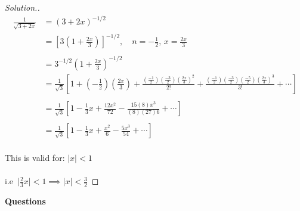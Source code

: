 \documentclass[11pt,a4paper]{article}
\theoremstyle{definition}
\newenvironment{solution}
  {\renewcommand{\qedsymbol}{}\begin{proof}[\textit{Solution}.]}
  {\end{proof}}
\begin{document}
\begin{solution}

\begin{align*}
\frac{1}{\sqrt{3+2x}} & = (3+2x)^{-1/2}\\
                      & = \left[3\left(1+\frac{2x}{3}\right)\right]^{-1/2},\quad  n=-\frac{1}{2},\, x=\frac{2x}{3}\\\\
                      & = 3^{-1/2}\left(1+\frac{2x}{3}\right)^{-1/2}\\
                      & = \frac{1}{\sqrt{3}}\left[1+\left(-\frac{1}{2}\right) \left(\frac{2x}{3}\right)+\frac{\left(\frac{-1}{2}\right) \left(\frac{-3}{2}\right) \left(\frac{2x}{3}\right)^2}{2!}+\frac{\left(\frac{-1}{2}\right)\left(\frac{-3}{2}\right)\left(\frac{-5}{2}\right)\left(\frac{2x}{3}\right)^3}{3!}+\cdots \right]\\\\
                      & = \frac{1}{\sqrt{3}}\left[1-\frac{1}{3}x+\frac{12x^2}{72}-\frac{15(8)x^3}{(8)(27)6}+\cdots \right]\\\\
                      & = \frac{1}{\sqrt{3}}\left[1-\frac{1}{3}x+\frac{x^2}{6}-\frac{5x^3}{54}+\cdots \right]\\
\end{align*}

This is valid for: $|x|<1$\\\\
i.e\, $\bigg|\frac{2}{3}x\bigg|<1\implies |x|<\frac{3}{2}$
\end{solution}
\pagebreak
\textbf{Questions}
\end{document}
